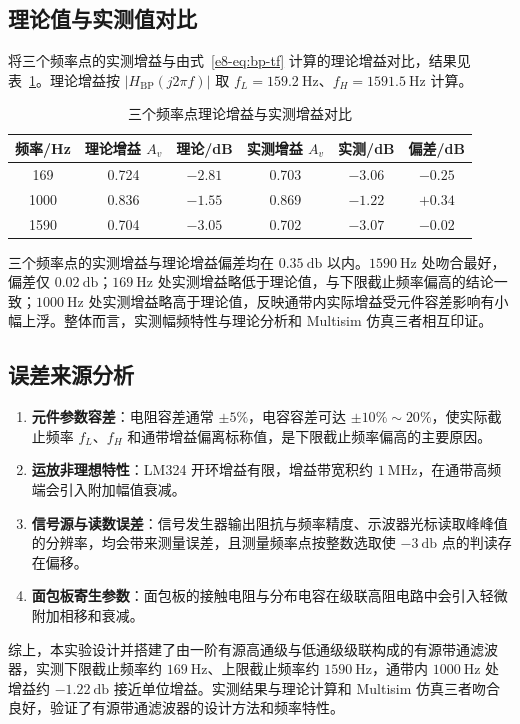 \subsection{理论值与实测值对比}

将三个频率点的实测增益与由式~\eqref{e8-eq:bp-tf} 计算的理论增益对比，结果见表~\ref{e8-tab:gain-comparison}。理论增益按 $|H_{\mathrm{BP}}(j2\pi f)|$ 取 $f_L = \SI{159.2}{\hertz}$、$f_H = \SI{1591.5}{\hertz}$ 计算。

\begin{table}[H]
    \centering
    \caption{三个频率点理论增益与实测增益对比}
    \label{e8-tab:gain-comparison}
    \begin{tabular}{cccccc}
        \toprule
        频率/Hz & 理论增益 $A_v$ & 理论/dB & 实测增益 $A_v$ & 实测/dB & 偏差/dB \\
        \midrule
        169  & 0.724 & $-2.81$ & 0.703 & $-3.06$ & $-0.25$ \\
        1000 & 0.836 & $-1.55$ & 0.869 & $-1.22$ & $+0.34$ \\
        1590 & 0.704 & $-3.05$ & 0.702 & $-3.07$ & $-0.02$ \\
        \bottomrule
    \end{tabular}
\end{table}

三个频率点的实测增益与理论增益偏差均在 $\SI{0.35}{\decibel}$ 以内。$\SI{1590}{\hertz}$ 处吻合最好，偏差仅 $\SI{0.02}{\decibel}$；$\SI{169}{\hertz}$ 处实测增益略低于理论值，与下限截止频率偏高的结论一致；$\SI{1000}{\hertz}$ 处实测增益略高于理论值，反映通带内实际增益受元件容差影响有小幅上浮。整体而言，实测幅频特性与理论分析和 Multisim 仿真三者相互印证。

\subsection{误差来源分析}

\begin{enumerate}[label=\arabic*.]
    \item \textbf{元件参数容差}：电阻容差通常 $\pm5\%$，电容容差可达 $\pm10\%\sim20\%$，使实际截止频率 $f_L$、$f_H$ 和通带增益偏离标称值，是下限截止频率偏高的主要原因。
    \item \textbf{运放非理想特性}：LM324 开环增益有限，增益带宽积约 $\SI{1}{\mega\hertz}$，在通带高频端会引入附加幅值衰减。
    \item \textbf{信号源与读数误差}：信号发生器输出阻抗与频率精度、示波器光标读取峰峰值的分辨率，均会带来测量误差，且测量频率点按整数选取使 $-\SI{3}{\decibel}$ 点的判读存在偏移。
    \item \textbf{面包板寄生参数}：面包板的接触电阻与分布电容在级联高阻电路中会引入轻微附加相移和衰减。
\end{enumerate}

综上，本实验设计并搭建了由一阶有源高通级与低通级级联构成的有源带通滤波器，实测下限截止频率约 $\SI{169}{\hertz}$、上限截止频率约 $\SI{1590}{\hertz}$，通带内 $\SI{1000}{\hertz}$ 处增益约 $-\SI{1.22}{\decibel}$ 接近单位增益。实测结果与理论计算和 Multisim 仿真三者吻合良好，验证了有源带通滤波器的设计方法和频率特性。

